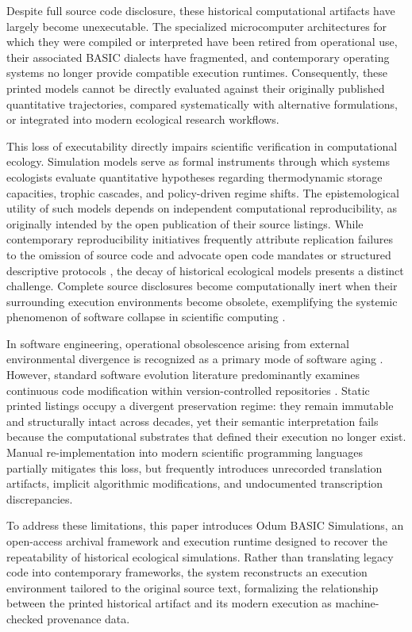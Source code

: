 \documentclass[11pt,a4paper]{article}
\begin{document}
Despite full source code disclosure, these historical computational artifacts have largely become unexecutable. The specialized microcomputer architectures for which they were compiled or interpreted have been retired from operational use, their associated BASIC dialects have fragmented, and contemporary operating systems no longer provide compatible execution runtimes. Consequently, these printed models cannot be directly evaluated against their originally published quantitative trajectories, compared systematically with alternative formulations, or integrated into modern ecological research workflows.

This loss of executability directly impairs scientific verification in computational ecology. Simulation models serve as formal instruments through which systems ecologists evaluate quantitative hypotheses regarding thermodynamic storage capacities, trophic cascades, and policy-driven regime shifts. The epistemological utility of such models depends on independent computational reproducibility, as originally intended by the open publication of their source listings. While contemporary reproducibility initiatives frequently attribute replication failures to the omission of source code and advocate open code mandates \citep{peng2011,ince2012} or structured descriptive protocols \citep{grimm2010}, the decay of historical ecological models presents a distinct challenge. Complete source disclosures become computationally inert when their surrounding execution environments become obsolete, exemplifying the systemic phenomenon of software collapse in scientific computing \citep{hinsen2019}.

In software engineering, operational obsolescence arising from external environmental divergence is recognized as a primary mode of software aging \citep{parnas1994}. However, standard software evolution literature predominantly examines continuous code modification within version-controlled repositories \citep{lehman1980,robles2005,spinellis2021}. Static printed listings occupy a divergent preservation regime: they remain immutable and structurally intact across decades, yet their semantic interpretation fails because the computational substrates that defined their execution no longer exist. Manual re-implementation into modern scientific programming languages partially mitigates this loss, but frequently introduces unrecorded translation artifacts, implicit algorithmic modifications, and undocumented transcription discrepancies.

To address these limitations, this paper introduces Odum BASIC Simulations, an open-access archival framework and execution runtime designed to recover the repeatability of historical ecological simulations. Rather than translating legacy code into contemporary frameworks, the system reconstructs an execution environment tailored to the original source text, formalizing the relationship between the printed historical artifact and its modern execution as machine-checked provenance data. 
\end{document}
